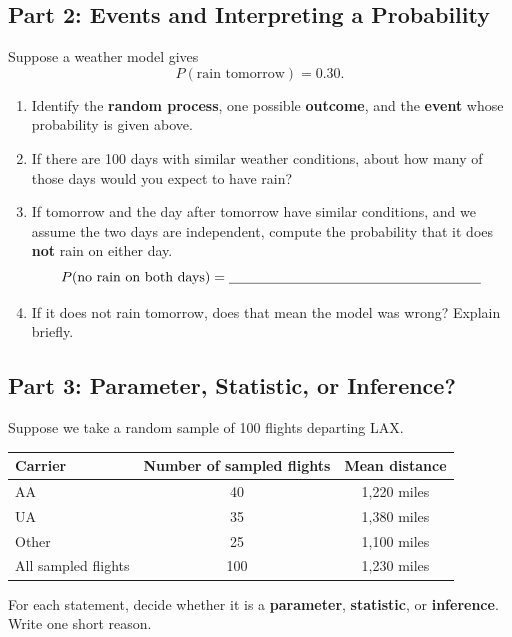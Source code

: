\documentclass{article}
\newcommand{\blankline}[1]{\underline{\hspace{#1}}}
\begin{document}
\subsection*{Part 2: Events and Interpreting a Probability}
Suppose a weather model gives
\[
P(\text{rain tomorrow}) = 0.30.
\]
\begin{enumerate}[label={\bfseries (\Alph*)},itemsep=.75em]
\item Identify the \textbf{random process}, one possible \textbf{outcome}, and the \textbf{event} whose probability is given above. \\[3em]
\item If there are 100 days with similar weather conditions, about how many of those days would you expect to have rain? \\[2.5em]
\item If tomorrow and the day after tomorrow have similar conditions, and we assume the two days are independent, compute the probability that it does \textbf{not} rain on either day.
\[
P(\text{no rain on both days}) = \blankline{2.5in}
\]
\item If it does not rain tomorrow, does that mean the model was wrong? Explain briefly. \\[3.5em]
\end{enumerate}

\subsection*{Part 3: Parameter, Statistic, or Inference?}
Suppose we take a random sample of 100 flights departing LAX.

\begin{center}
\renewcommand{\arraystretch}{1.3}
\begin{tabular}{lcc}
\toprule
\textbf{Carrier} & \textbf{Number of sampled flights} & \textbf{Mean distance} \\
\midrule
AA & 40 & 1,220 miles \\
UA & 35 & 1,380 miles \\
Other & 25 & 1,100 miles \\
All sampled flights & 100 & 1,230 miles \\
\bottomrule
\end{tabular}
\end{center}

For each statement, decide whether it is a \textbf{parameter}, \textbf{statistic}, or \textbf{inference}. Write one short reason.
\end{document}
